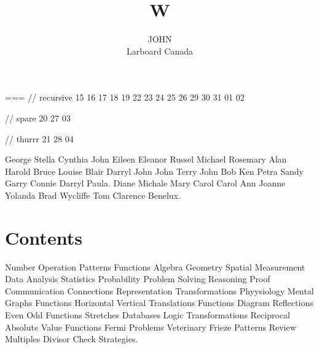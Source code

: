 \documentclass{textbook}
\title{W}
\author{
  \parbox{0.3\linewidth}{\centering JOHN\\Larboard Canada}
  }
\begin{document}
\maketitle

                                                        ===
// recursive
15 16 17 18 19
22 23 24 25 26
29 30 31 01 02

// spare
20
27
03

// thurrr
21
28
04

George Stella Cynthia John Eileen Eleanor Russel Michael Rosemary Alan Harold Bruce Louise Blair Darryl John John Terry John Bob Ken Petra Sandy Garry Connie Darryl Paula. Diane Michale Mary Carol Carol Ann Joanne Yolanda Brad Wycliffe Tom Clarence Benelux.

\section{Contents}

Number Operation Patterns Functions Algebra Geometry Spatial Measurement Data Analysis Statistics Probability Problem Solving Reasoning Proof Communication Connections Representation Transformations Phyysiology Mental Graphs Functions Horizontal Vertical Translations Functions Diagram Reflections Even Odd Functions Stretches Databases Logic Transformations Reciprocal Absolute Value Functions Fermi Problems Veterinary Frieze Patterns Review Multiples Divisor Check Strategies.
\end{document}
